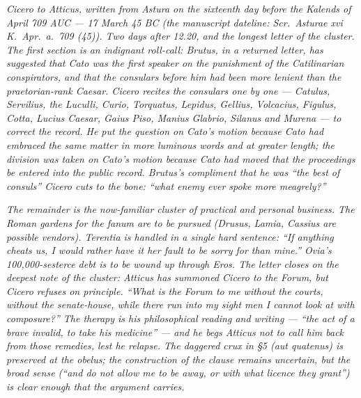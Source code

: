 
\textit{Cicero to Atticus, written from Astura on
the sixteenth day before the Kalends of April 709
AUC --- 17 March 45 BC (the manuscript dateline:
\textit{Scr.\ Asturae xvi K.\ Apr.\ a.\ 709 (45)}).
Two days after 12.20, and the longest letter of the
cluster. The first section is an indignant
roll-call: Brutus, in a returned letter, has
suggested that Cato was the first speaker on
the punishment of the Catilinarian conspirators, and
that the consulars before him had been more lenient
than the praetorian-rank Caesar. Cicero recites
the consulars one by one --- Catulus, Servilius,
the Luculli, Curio, Torquatus, Lepidus, Gellius,
Volcacius, Figulus, Cotta, Lucius Caesar, Gaius
Piso, Manius Glabrio, Silanus and Murena --- to
correct the record. He put the question on Cato's
motion because Cato had embraced the same matter in
more luminous words and at greater length; the
division was taken on Cato's motion because Cato had
moved that the proceedings be entered into the
public record. Brutus's compliment that he was
``the best of consuls'' Cicero cuts to the bone:
``what enemy ever spoke more meagrely?''}

\textit{The remainder is the now-familiar cluster of
practical and personal business. The Roman gardens
for the \textit{fanum} are to be pursued (Drusus,
Lamia, Cassius are possible vendors). Terentia is
handled in a single hard sentence: ``If anything
cheats us, I would rather have it her fault to be
sorry for than mine.'' Ovia's 100,000-sesterce
debt is to be wound up through Eros. The letter
closes on the deepest note of the cluster: Atticus
has summoned Cicero to the Forum, but Cicero refuses
on principle. ``What is the Forum to me without the
courts, without the senate-house, while there run
into my sight men I cannot look at with composure?''
The therapy is his philosophical reading and writing
--- ``the act of a brave invalid, to take his
medicine'' --- and he begs Atticus not to call him
back from those remedies, lest he relapse. The
daggered crux in \S5 (\textit{aut quatenus}) is
preserved at the obelus; the construction of the
clause remains uncertain, but the broad sense
(``and do not allow me to be away, or with what
licence they grant'') is clear enough that the
argument carries.}
